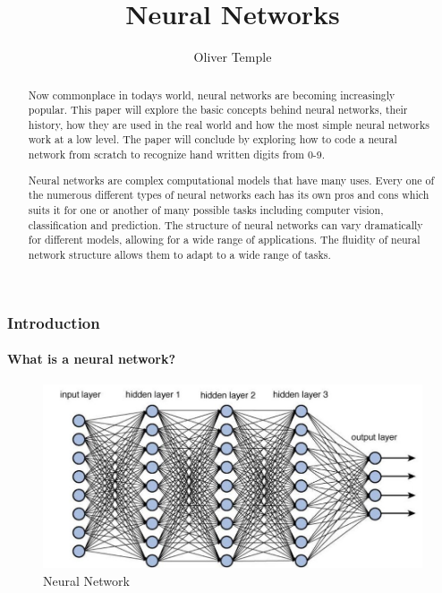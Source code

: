 \documentclass{beamer}
\title{Neural Networks}
\author{Oliver Temple}
\begin{document}
\begin{frame}
\titlepage
\end{frame}

\begin{frame}
\begin{abstract}
    Now commonplace in todays world, neural networks are becoming increasingly popular. This paper will explore the basic concepts behind neural networks, their history, how they are used in the real world and how the most simple neural networks work at a low level. The paper will conclude by exploring how to code a neural network from scratch to recognize hand written digits from 0-9.

    Neural networks are complex computational models that have many uses. Every one of the numerous different types of neural networks each has its own pros and cons which suits it for one or another of many possible tasks including computer vision, classification and prediction. The structure of neural networks can vary dramatically for different models, allowing for a wide range of applications. The fluidity of neural network structure allows them to adapt to a wide range of tasks.
    
\end{abstract}
\end{frame}

\begin{frame}
\frametitle{Introduction}
\framesubtitle{What is a neural network?}
\begin{figure}[h!]
    \includegraphics[width=\textwidth]{./assets/neural_network.jpeg}
    \caption{Neural Network}
    \label{fig:neural_network}
\end{figure}
\end{frame}
\end{document}
